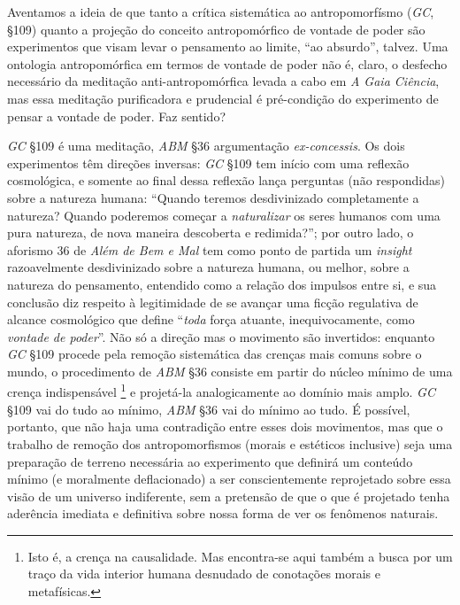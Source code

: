 \documentclass[
	12pt,				%
	openright,			%
	oneside,			%
	a4paper,			%
	english,			%
	french,				%
	spanish,			%
	brazil				%
	]{abntex2}
\begin{document}
	Aventamos a ideia de que tanto a crítica sistemática ao antropomorfísmo (\textit{GC}, §109) quanto a projeção do conceito antropomórfico de vontade de poder são experimentos que visam levar o pensamento ao limite, “ao absurdo”, talvez. Uma ontologia antropomórfica em termos de vontade de poder não é, claro, o desfecho necessário da meditação anti-antropomórfica levada a cabo em \textit{A Gaia Ciência}, mas essa meditação purificadora e prudencial é pré-condição do experimento de pensar a vontade de poder. Faz sentido?

\textit{GC} §109 é uma meditação, \textit{ABM} §36 argumentação \textit{ex-concessis}. Os dois experimentos têm direções inversas: \textit{GC} §109 tem início com uma reflexão cosmológica, e somente ao final dessa reflexão lança perguntas (não respondidas) sobre a natureza humana: “Quando teremos desdivinizado completamente a natureza? Quando poderemos começar a \textit{naturalizar} os seres humanos com uma pura natureza, de nova maneira descoberta e redimida?”; por outro lado, o aforismo 36 de \textit{Além de Bem e Mal} tem como ponto de partida um \textit{insight} razoavelmente desdivinizado sobre a natureza humana, ou melhor, sobre a natureza do pensamento, entendido como a relação dos impulsos entre si, e sua conclusão diz respeito à legitimidade de se avançar uma ficção regulativa de alcance cosmológico que define “\textit{toda} força atuante, inequivocamente, como \textit{vontade de poder}”. Não só a direção mas o movimento são invertidos: enquanto \textit{GC} §109 procede pela remoção sistemática das crenças mais comuns sobre o mundo, o procedimento de \textit{ABM} §36 consiste em partir do núcleo mínimo de uma crença indispensável
\footnote{Isto é, a crença na causalidade. Mas encontra-se aqui também a busca por um traço da vida interior humana desnudado de conotações morais e metafísicas.} 
e projetá-la analogicamente ao domínio mais amplo. \textit{GC} §109 vai do tudo ao mínimo, \textit{ABM} §36 vai do mínimo ao tudo. É possível, portanto, que não haja uma contradição entre esses dois movimentos, mas que o trabalho de remoção dos antropomorfismos (morais e estéticos inclusive) seja uma preparação de terreno necessária ao experimento que definirá um conteúdo mínimo (e moralmente deflacionado) a ser conscientemente reprojetado sobre essa visão de um universo indiferente, sem a pretensão de que o que é projetado tenha aderência imediata e definitiva sobre nossa forma de ver os fenômenos naturais.
\end{document}
